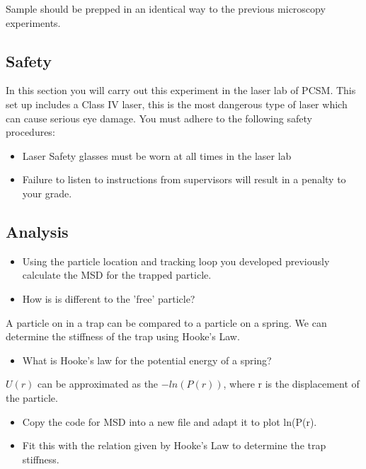\documentclass[12pt,a4paper,twoside]{article}
\begin{document}
Sample should be prepped in an identical way to the previous microscopy experiments.

\subsection{Safety}
In this section you will carry out this experiment in the laser lab of PCSM. This set up includes a Class IV laser, this is the most dangerous type of laser which can cause serious eye damage. You must adhere to the following safety procedures:

\begin{itemize}
    \item Laser Safety glasses must be worn at all times in the laser lab
    \item Failure to listen to instructions from supervisors will result in a penalty to your grade.
\end{itemize}

\subsection{Analysis}
\begin{itemize}
	\item Using the particle location and tracking loop you developed previously calculate the MSD for the trapped particle. 
	\item How is is different to the 'free' particle?
	\vspace{2cm}
\end{itemize}

 A particle on in a trap can be compared to a particle on a spring. We can determine the stiffness of the trap using Hooke's Law.
 \begin{itemize}
	\item What is Hooke's law for the potential energy of a spring?
	\vspace{2cm}
\end{itemize}
	
$U(r)$ can be approximated as the $-ln(P(r))$, where r is the displacement of the particle. 
 \begin{itemize}
	\item Copy the code for MSD into a new file and adapt it to plot ln(P(r).
	\item Fit this with the relation given by Hooke's Law to determine the trap stiffness.
	\vspace{2cm}
\end{itemize}
\end{document}
